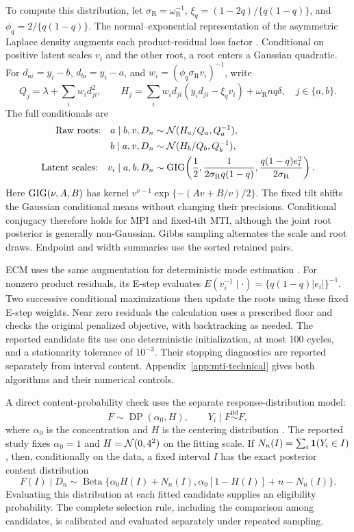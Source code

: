 To compute this distribution, let
\(\sigma_{\mathrm R}=\omega_{\mathrm R}^{-1}\),
\(\xi_q=(1-2q)/\{q(1-q)\}\), and
\(\phi_q=2/\{q(1-q)\}\). The normal--exponential representation of the
asymmetric Laplace density augments each product-residual loss factor
\citep{qdesn-KozumiKobayashi2011Gibbs}. Conditional on positive latent scales
\(v_i\) and the other root, a root enters a Gaussian quadratic. For
\(d_{ai}=y_i-b\), \(d_{bi}=y_i-a\), and
\(w_i=(\phi_q\sigma_{\mathrm R}v_i)^{-1}\), write
\[
Q_j=\lambda+\sum_iw_i d_{ji}^2,\qquad
H_j=\sum_iw_i d_{ji}(y_i d_{ji}-\xi_qv_i)+\omega_{\mathrm R}nq\delta,
\quad j\in\{a,b\}.
\]
The full conditionals are
\begin{align}
\text{Raw roots:}\quad
a\mid b,v,D_n&\sim\mathcal{N}(H_a/Q_a,Q_a^{-1}),\notag\\
b\mid a,v,D_n&\sim\mathcal{N}(H_b/Q_b,Q_b^{-1}),
\label{rqr2026:eq:mti-root-conditionals}\\
\text{Latent scales:}\quad
v_i\mid a,b,D_n&\sim\operatorname{GIG}\!\left(
\frac12,\frac{1}{2\sigma_{\mathrm R}q(1-q)},
\frac{q(1-q)e_i^2}{2\sigma_{\mathrm R}}\right).
\label{rqr2026:eq:mti-scale-conditional}
\end{align}
Here \(\operatorname{GIG}(\nu,A,B)\) has kernel
\(v^{\nu-1}\exp\{-(Av+B/v)/2\}\). The fixed tilt shifts the Gaussian
conditional means without changing their precisions. Conditional conjugacy
therefore holds for MPI and fixed-tilt MTI, although the joint root posterior
is generally non-Gaussian. Gibbs sampling alternates the scale and root
draws. Endpoint and width summaries use the sorted retained pairs.

ECM uses the same augmentation for deterministic mode estimation
\citep{rqr-DempsterLairdRubin1977EM,rqr-MengRubin1993ECM}. For nonzero
product residuals, its E-step evaluates
\(E(v_i^{-1}\mid\cdot)=\{q(1-q)|e_i|\}^{-1}\). Two successive conditional
maximizations then update the roots using these fixed E-step weights.
Near zero residuals the calculation uses a prescribed floor and checks the
original penalized objective, with backtracking as needed. The reported
candidate fits use one deterministic initialization, at most 100 cycles,
and a stationarity tolerance of \(10^{-3}\). Their stopping diagnostics are
reported separately from interval content. Appendix~\ref{app:mti-technical}
gives both algorithms and their numerical controls.

A direct content-probability check uses the separate response-distribution
model:
\[
F\sim\operatorname{DP}(\alpha_0,H),\qquad Y_i\mid F\stackrel{\mathrm{iid}}{\sim}F,
\]
where \(\alpha_0\) is the concentration and \(H\) is the centering distribution
\citep{rqr-Ferguson1973DP}. The reported study fixes \(\alpha_0=1\) and
\(H=\mathcal{N}(0,4^2)\) on the fitting scale. If
\(N_n(I)=\sum_i\mathbf{1}(Y_i\in I)\), then, conditionally on the data, a fixed
interval \(I\) has the exact posterior content distribution
\[
F(I)\mid D_n\sim\operatorname{Beta}\{\alpha_0H(I)+N_n(I),
\alpha_0[1-H(I)]+n-N_n(I)\}.
\]
Evaluating this distribution at each fitted candidate supplies an eligibility
probability. The complete selection rule, including the comparison among
candidates, is calibrated and evaluated separately under repeated sampling.

